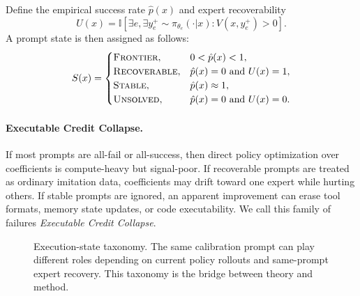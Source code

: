 \documentclass[11pt]{article}
\newcommand{\creditcollapse}{\textit{Executable Credit Collapse}\xspace}
\begin{document}
Define the empirical success rate $\hat p(x)$ and expert recoverability
\begin{equation}
    U(x)=\mathbb{I}\left[\exists e,\exists y_e^+\sim \pi_{\theta_e}(\cdot|x): V(x,y_e^+)>0\right].
\end{equation}
A prompt state is then assigned as follows:
\begin{equation}
S(x)=
\begin{cases}
\textsc{Frontier}, & 0<\hat p(x)<1,\\
\textsc{Recoverable}, & \hat p(x)=0 \text{ and } U(x)=1,\\
\textsc{Stable}, & \hat p(x)\approx1,\\
\textsc{Unsolved}, & \hat p(x)=0 \text{ and } U(x)=0.\\
\end{cases}
\end{equation}

\paragraph{Executable Credit Collapse.}  If most prompts are all-fail or all-success, then direct policy optimization over coefficients is compute-heavy but signal-poor.  If recoverable prompts are treated as ordinary imitation data, coefficients may drift toward one expert while hurting others.  If stable prompts are ignored, an apparent improvement can erase tool formats, memory state updates, or code executability.  We call this family of failures \creditcollapse.

\begin{figure}[t]
\centering
{}
\caption{Execution-state taxonomy.  The same calibration prompt can play different roles depending on current policy rollouts and same-prompt expert recovery.  This taxonomy is the bridge between theory and method.}
\label{fig:state-taxonomy}
\end{figure}
\end{document}
